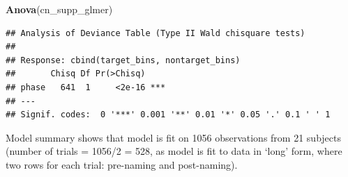 \documentclass[
  doc,floatsintext]{apa6}
\newenvironment{Shaded}{\begin{snugshade}}{\end{snugshade}}
\newcommand{\AttributeTok}[1]{\textcolor[rgb]{0.13,0.29,0.53}{#1}}
\newcommand{\DecValTok}[1]{\textcolor[rgb]{0.00,0.00,0.81}{#1}}
\newcommand{\FunctionTok}[1]{\textcolor[rgb]{0.13,0.29,0.53}{\textbf{#1}}}
\newcommand{\NormalTok}[1]{#1}
\newcommand{\OtherTok}[1]{\textcolor[rgb]{0.56,0.35,0.01}{#1}}
\newcommand{\SpecialCharTok}[1]{\textcolor[rgb]{0.81,0.36,0.00}{\textbf{#1}}}
\newcommand{\StringTok}[1]{\textcolor[rgb]{0.31,0.60,0.02}{#1}}
\begin{document}
\begin{Shaded}
\begin{Highlighting}[]
\FunctionTok{Anova}\NormalTok{(cn\_supp\_glmer)}
\end{Highlighting}
\end{Shaded}

\begin{verbatim}
## Analysis of Deviance Table (Type II Wald chisquare tests)
## 
## Response: cbind(target_bins, nontarget_bins)
##       Chisq Df Pr(>Chisq)    
## phase   641  1     <2e-16 ***
## ---
## Signif. codes:  0 '***' 0.001 '**' 0.01 '*' 0.05 '.' 0.1 ' ' 1
\end{verbatim}

Model summary shows that model is fit on 1056 observations from 21 subjects
(number of trials = 1056/2 = 528, as model is fit to data in `long' form,
where two rows for each trial: pre-naming and post-naming).

\begin{Shaded}
\end{Shaded}
\end{document}
